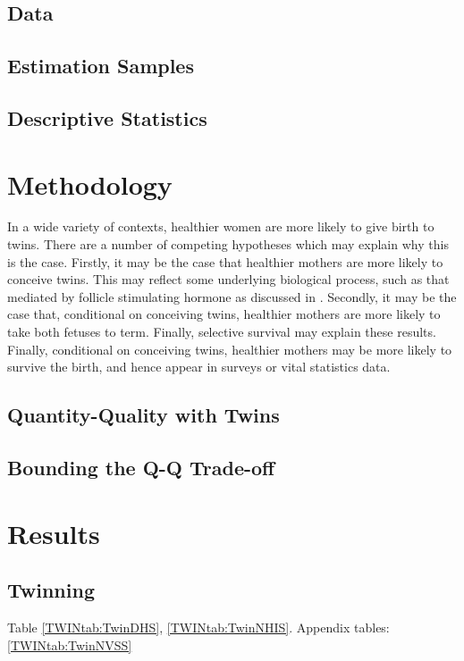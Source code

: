 \documentclass{article}[11pt,subeqn]
\begin{document}
\begin{spacing}{1.4}
\subsection{Data}                                  \label{TWINsscn:data}
\subsection{Estimation Samples}                    \label{TWINsscn:samples}
\subsection{Descriptive Statistics}                \label{TWINsscn:descriptives}
\section{Methodology}                              \label{TWINscn:method}

In a wide variety of contexts, healthier women are more likely to give birth to
twins.  There are a number of competing hypotheses which may explain why this is
the case.  Firstly, it may be the case that healthier mothers are more likely to
conceive twins.  This may reflect some underlying biological process, such as 
that mediated by follicle stimulating hormone as discussed in \citet{Hall2003}.
Secondly, it may be the case that, conditional on conceiving twins, healthier 
mothers are more likely to take both fetuses to term.  Finally, selective 
survival may explain these results.  Finally, conditional on conceiving twins, 
healthier mothers may be more likely to survive the birth, and hence appear in
surveys or vital statistics data. 

\subsection{Quantity-Quality with Twins}           \label{TWINsscn:methodQQ}
\subsection{Bounding the Q-Q Trade-off}            \label{TWINsscn:methodBounds}
\section{Results}                                  \label{TWINscn:results}
\subsection{Twinning}                              \label{TWINsscn:twinning}
Table \ref{TWINtab:TwinDHS}, \ref{TWINtab:TwinNHIS}.
Appendix tables: \ref{TWINtab:TwinNVSS}

\end{spacing}
\end{document}

